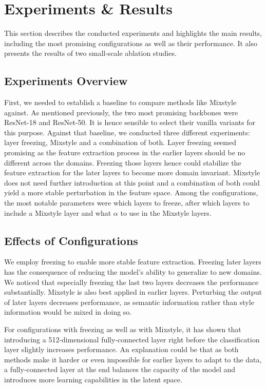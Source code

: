 \section{Experiments \& Results}

This section describes the conducted experiments and highlights the main results, including the most promising configurations as well as their performance. It also presents the results of two small-scale ablation studies.

\subsection{Experiments Overview}

First, we needed to establish a baseline to compare methods like Mixstyle against. As mentioned previously, the two most promising backbones were ResNet-18 and ResNet-50. It is hence sensible to select their vanilla variants for this purpose. Against that baseline, we conducted three different experiments: layer freezing, Mixstyle and a combination of both. Layer freezing seemed promising as the feature extraction process in the earlier layers should be no different across the domains. Freezing those layers hence could stabilize the feature extraction for the later layers to become more domain invariant. Mixstyle does not need further introduction at this point and a combination of both could yield a more stable perturbation in the feature space. Among the configurations, the most notable parameters were which layers to freeze, after which layers to include a Mixstyle layer and what $\alpha$ to use in the Mixstyle layers.

\subsection{Effects of Configurations}

We employ freezing to enable more stable feature extraction. Freezing later layers has the consequence of reducing the model's ability to generalize to new domains. We noticed that especially freezing the last two layers decreases the performance substantially. Mixstyle is also best applied in earlier layers. Perturbing the output of later layers decreases performance, as semantic information rather than style information would be mixed in doing so.

For configurations with freezing as well as with Mixstyle, it has shown that introducing a 512-dimensional fully-connected layer right before the classification layer slightly increases performance. An explanation could be that as both methods make it harder or even impossible for earlier layers to adapt to the data, a fully-connected layer at the end balances the capacity of the model and introduces more learning capabilities in the latent space.

